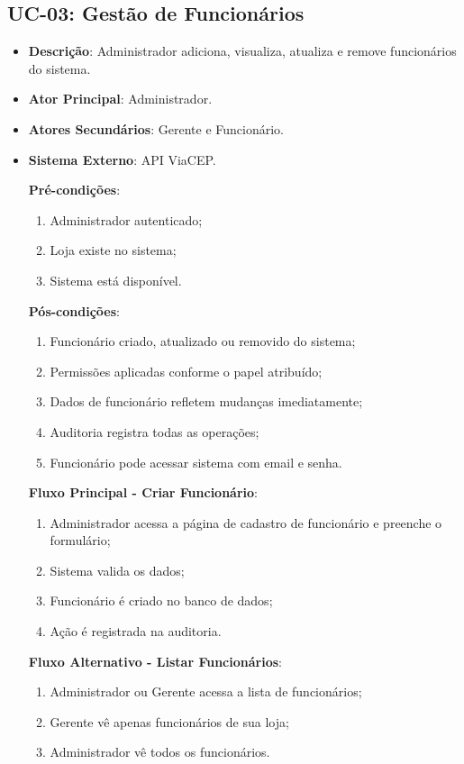 \subsection{UC-03: Gestão de Funcionários}

\begin{itemize}[topsep=1pt, itemsep=0pt]
  \item[]\textbf{Descrição}: Administrador adiciona, visualiza, atualiza e remove funcionários do sistema.

  \item[]\textbf{Ator Principal}: Administrador.

  \item[]\textbf{Atores Secundários}: Gerente e Funcionário.

  \item[]\textbf{Sistema Externo}: API ViaCEP.

  \textbf{Pré-condições}:
  \begin{enumerate}
    \item Administrador autenticado;
    \item Loja existe no sistema;
    \item Sistema está disponível.
  \end{enumerate}

  \textbf{Pós-condições}:
  \begin{enumerate}
    \item Funcionário criado, atualizado ou removido do sistema;
    \item Permissões aplicadas conforme o papel atribuído;
    \item Dados de funcionário refletem mudanças imediatamente;
    \item Auditoria registra todas as operações;
    \item Funcionário pode acessar sistema com email e senha.
  \end{enumerate}

  \textbf{Fluxo Principal - Criar Funcionário}:
  \begin{enumerate}
    \item Administrador acessa a página de cadastro de funcionário e preenche o formulário;
    \item Sistema valida os dados;
    \item Funcionário é criado no banco de dados;
    \item Ação é registrada na auditoria.
  \end{enumerate}

  \textbf{Fluxo Alternativo - Listar Funcionários}:
  \begin{enumerate}
    \item Administrador ou Gerente acessa a lista de funcionários;
    \item Gerente vê apenas funcionários de sua loja;
    \item Administrador vê todos os funcionários.
  \end{enumerate}


\end{itemize}
